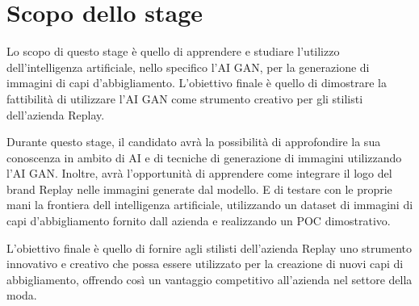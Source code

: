 \section*{Scopo dello stage}
Lo scopo di questo stage è quello di apprendere e studiare l'utilizzo dell'intelligenza artificiale,
nello specifico l'AI GAN, per la generazione di immagini di capi d'abbigliamento.
L'obiettivo finale è quello di dimostrare la fattibilità di utilizzare
l'AI GAN come strumento creativo per gli stilisti dell'azienda Replay.

Durante questo stage, il candidato avrà la possibilità di approfondire la sua conoscenza in ambito di
AI e di tecniche di generazione di immagini utilizzando l'AI GAN. Inoltre, avrà l'opportunità di apprendere
come integrare il logo del brand Replay nelle immagini generate dal modello. E di testare con le
proprie mani la frontiera dell intelligenza artificiale, utilizzando un dataset di immagini di
capi d'abbigliamento fornito dall azienda e realizzando un POC dimostrativo.

L'obiettivo finale è quello di fornire agli stilisti dell'azienda Replay uno strumento innovativo
e creativo che possa essere utilizzato per la creazione di nuovi capi di abbigliamento, offrendo così un
vantaggio competitivo all'azienda nel settore della moda.
